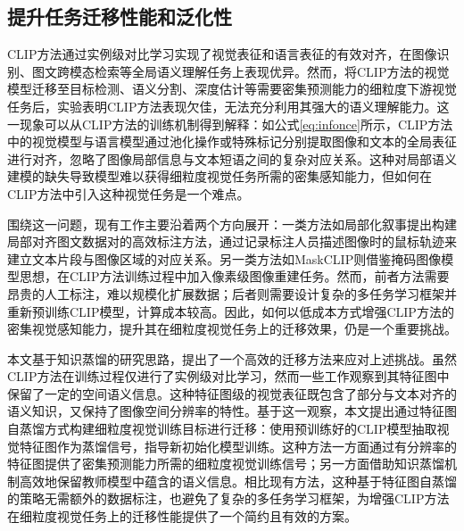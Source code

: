 
\subsection{提升任务迁移性能和泛化性}

CLIP方法通过实例级对比学习实现了视觉表征和语言表征的有效对齐，在图像识别、图文跨模态检索等全局语义理解任务上表现优异。然而，将CLIP方法的视觉模型迁移至目标检测、语义分割、深度估计等需要密集预测能力的细粒度下游视觉任务后，实验表明CLIP方法表现欠佳，无法充分利用其强大的语义理解能力。这一现象可以从CLIP方法的训练机制得到解释：如公式\eqref{eq:infonce}所示，CLIP方法中的视觉模型与语言模型通过池化操作或特殊标记分别提取图像和文本的全局表征进行对齐，忽略了图像局部信息与文本短语之间的复杂对应关系。这种对局部语义建模的缺失导致模型难以获得细粒度视觉任务所需的密集感知能力，但如何在CLIP方法中引入这种视觉任务是一个难点。

围绕这一问题，现有工作主要沿着两个方向展开：一类方法如局部化叙事\cite{LocNar}提出构建局部对齐图文数据对的高效标注方法，通过记录标注人员描述图像时的鼠标轨迹来建立文本片段与图像区域的对应关系。另一类方法如MaskCLIP\cite{MaskCLIP}则借鉴掩码图像模型\cite{he2022masked}思想，在CLIP方法训练过程中加入像素级图像重建任务。然而，前者方法需要昂贵的人工标注，难以规模化扩展数据；后者则需要设计复杂的多任务学习框架并重新预训练CLIP模型，计算成本较高。因此，如何以低成本方式增强CLIP方法的密集视觉感知能力，提升其在细粒度视觉任务上的迁移效果，仍是一个重要挑战。

本文基于知识蒸馏\cite{hinton2015knowledge}的研究思路，提出了一个高效的迁移方法来应对上述挑战。虽然CLIP方法在训练过程仅进行了实例级对比学习，然而一些工作观察到其特征图中保留了一定的空间语义信息\cite{clipseg}。这种特征图级的视觉表征既包含了部分与文本对齐的语义知识，又保持了图像空间分辨率的特性。基于这一观察，本文提出通过特征图自蒸馏方式构建细粒度视觉训练目标进行迁移：使用预训练好的CLIP模型抽取视觉特征图作为蒸馏信号，指导新初始化模型训练。这种方法一方面通过有分辨率的特征图提供了密集预测能力所需的细粒度视觉训练信号；另一方面借助知识蒸馏机制高效地保留教师模型中蕴含的语义信息。相比现有方法，这种基于特征图自蒸馏的策略无需额外的数据标注，也避免了复杂的多任务学习框架，为增强CLIP方法在细粒度视觉任务上的迁移性能提供了一个简约且有效的方案。

